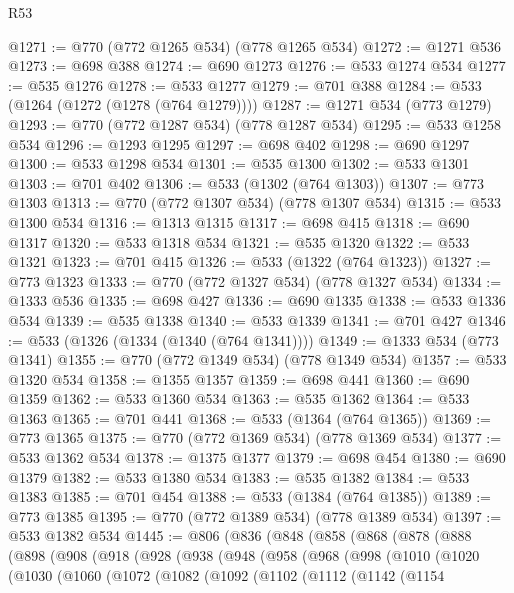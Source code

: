\begin{lexlean}{R53}
\begin{coremodule}
@1271 := @770 (@772 @1265 @534) (@778 @1265 @534)
@1272 := @1271 @536
@1273 := @698 @388
@1274 := @690 @1273
@1276 := @533 @1274 @534
@1277 := @535 @1276
@1278 := @533 @1277
@1279 := @701 @388
@1284 := @533 (@1264 (@1272 (@1278 (@764 @1279))))
@1287 := @1271 @534 (@773 @1279)
@1293 := @770 (@772 @1287 @534) (@778 @1287 @534)
@1295 := @533 @1258 @534
@1296 := @1293 @1295
@1297 := @698 @402
@1298 := @690 @1297
@1300 := @533 @1298 @534
@1301 := @535 @1300
@1302 := @533 @1301
@1303 := @701 @402
@1306 := @533 (@1302 (@764 @1303))
@1307 := @773 @1303
@1313 := @770 (@772 @1307 @534) (@778 @1307 @534)
@1315 := @533 @1300 @534
@1316 := @1313 @1315
@1317 := @698 @415
@1318 := @690 @1317
@1320 := @533 @1318 @534
@1321 := @535 @1320
@1322 := @533 @1321
@1323 := @701 @415
@1326 := @533 (@1322 (@764 @1323))
@1327 := @773 @1323
@1333 := @770 (@772 @1327 @534) (@778 @1327 @534)
@1334 := @1333 @536
@1335 := @698 @427
@1336 := @690 @1335
@1338 := @533 @1336 @534
@1339 := @535 @1338
@1340 := @533 @1339
@1341 := @701 @427
@1346 := @533 (@1326 (@1334 (@1340 (@764 @1341))))
@1349 := @1333 @534 (@773 @1341)
@1355 := @770 (@772 @1349 @534) (@778 @1349 @534)
@1357 := @533 @1320 @534
@1358 := @1355 @1357
@1359 := @698 @441
@1360 := @690 @1359
@1362 := @533 @1360 @534
@1363 := @535 @1362
@1364 := @533 @1363
@1365 := @701 @441
@1368 := @533 (@1364 (@764 @1365))
@1369 := @773 @1365
@1375 := @770 (@772 @1369 @534) (@778 @1369 @534)
@1377 := @533 @1362 @534
@1378 := @1375 @1377
@1379 := @698 @454
@1380 := @690 @1379
@1382 := @533 @1380 @534
@1383 := @535 @1382
@1384 := @533 @1383
@1385 := @701 @454
@1388 := @533 (@1384 (@764 @1385))
@1389 := @773 @1385
@1395 := @770 (@772 @1389 @534) (@778 @1389 @534)
@1397 := @533 @1382 @534
@1445 := @806
    (@836
      (@848
        (@858
          (@868
            (@878
              (@888
                (@898
                  (@908
                    (@918
                      (@928
                        (@938
                          (@948
                            (@958
                              (@968
                                (@998
                                  (@1010
                                    (@1020
                                      (@1030
                                        (@1060
                                          (@1072
                                            (@1082
                                              (@1092
                                                (@1102
                                                  (@1112
                                                    (@1142
                                                      (@1154

\end{coremodule}
\end{lexlean}
